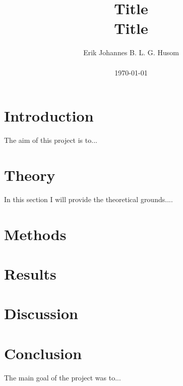 \documentclass[10pt, a4paper]{amsart}
\title[Title]{Title \\ \large
Title}
\author[Husom]{Erik Johannes B. L. G. Husom \\ \\ \today}
\numberwithin{figure}{section}
\numberwithin{table}{section}
\begin{document}
\begin{abstract}

\end{abstract}
\maketitle


\tableofcontents

\section{Introduction}
The aim of this project is to...


\section{Theory}
In this section I will provide the theoretical grounds...\cite{jensen}.


\section{Methods}

\section{Results}

\section{Discussion}

\section{Conclusion}
The main goal of the project was to...




\end{document}
